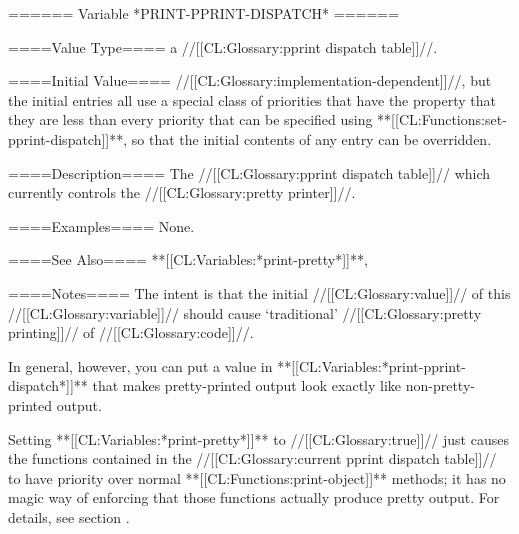 ====== Variable *PRINT-PPRINT-DISPATCH* ======

====Value Type====
a //[[CL:Glossary:pprint dispatch table]]//.

====Initial Value====
//[[CL:Glossary:implementation-dependent]]//, but the initial entries all use a special class of priorities that have the property that they are less than every priority that can be specified using **[[CL:Functions:set-pprint-dispatch]]**, so that the initial contents of any entry can be overridden.

====Description====
The //[[CL:Glossary:pprint dispatch table]]// which currently controls the //[[CL:Glossary:pretty printer]]//.

====Examples====
None.

====See Also====
**[[CL:Variables:*print-pretty*]]**, {\secref\PPrintDispatchTables}

====Notes====
The intent is that the initial //[[CL:Glossary:value]]// of this //[[CL:Glossary:variable]]// should cause `traditional' //[[CL:Glossary:pretty printing]]// of //[[CL:Glossary:code]]//.

In general, however, you can put a value in **[[CL:Variables:*print-pprint-dispatch*]]** that makes pretty-printed output look exactly like non-pretty-printed output.

Setting **[[CL:Variables:*print-pretty*]]** to //[[CL:Glossary:true]]// just causes the functions contained in the //[[CL:Glossary:current pprint dispatch table]]// to have priority over normal **[[CL:Functions:print-object]]** methods; it has no magic way of enforcing that those functions actually produce pretty output. For details, see section {\secref\PPrintDispatchTables}.

 
